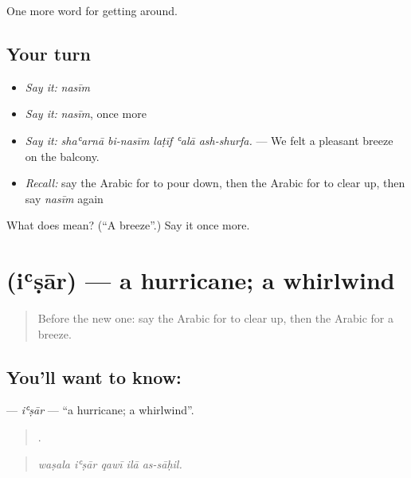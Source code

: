 \begin{grammarlens}[title={What you've built}]
One more word for getting around.
\end{grammarlens}

\subsection*{Your turn}
\begin{itemize}
\raggedright
  \item \emph{Say it:} \emph{nasīm}
  \item \emph{Say it:} \emph{nasīm}, once more
  \item \emph{Say it:} \emph{shaʿarnā bi-nasīm laṭīf ʿalā ash-shurfa.} — We felt a pleasant breeze on the balcony.
  \item \emph{Recall:} say the Arabic for to pour down, then the Arabic for to clear up, then say \emph{nasīm} again
\end{itemize}

\begin{tcolorbox}[breakable,colback=teal!4,colframe=teal!35!black,title={Before you move on}]
What does  mean? (\textquotedblleft{}A breeze\textquotedblright{}.) Say it once more.
\end{tcolorbox}
\section[\texorpdfstring{\ar{إعصار} (iʿṣār)}{إعصار (iʿṣār)}]{ (iʿṣār) — a hurricane; a whirlwind}

\label{lesson:AR-C482-isar}



\begin{quote}
Before the new one: say the Arabic for to clear up, then the Arabic for a breeze.
\end{quote}

\subsection*{You'll want to know: }
\textbf{} — \emph{iʿṣār} — \textquotedblleft{}a hurricane; a whirlwind\textquotedblright{}.

\begin{quote}
    .
\end{quote}

\begin{quote}
\emph{waṣala iʿṣār qawī ilā as-sāḥil.}
\end{quote}

